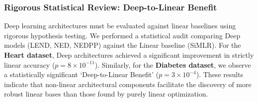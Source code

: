 \documentclass[
  letterpaper,
]{report}
\begin{document}
\subsubsection{Rigorous Statistical Review: Deep-to-Linear
Benefit}\label{rigorous-statistical-review-deep-to-linear-benefit}

Deep learning architectures must be evaluated against linear baselines
using rigorous hypothesis testing. We performed a statistical audit
comparing Deep models (LEND, NED, NEDPP) against the Linear baseline
(SiMLR). For the \textbf{Heart dataset}, Deep architectures achieved a
significant improvement in strictly linear accuracy
(\(p = 8 \times 10^{-11}\)). Similarly, for the \textbf{Diabetes
dataset}, we observe a statistically significant `Deep-to-Linear
Benefit' (\(p = 3 \times 10^{-4}\)). These results indicate that
non-linear architectural components facilitate the discovery of more
robust linear bases than those found by purely linear optimization.
\end{document}
